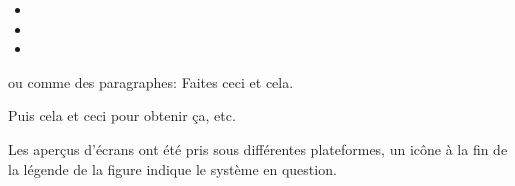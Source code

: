 \begin{itemize}[label=--]
\item {}
\item {}
\item {}
\end{itemize}
ou comme des paragraphes:
\vspace{0.5cm}
\nix{} \osx{} Faites ceci et cela.
\par
\vspace{0.5cm}
\win{} Puis cela et ceci pour obtenir ça, etc. 
\par\vspace{0.5cm}
Les aperçus d'écrans ont été pris sous différentes plateformes, un icône à la fin de la légende de la figure indique le système en question.
